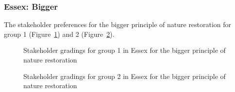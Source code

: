 \documentclass[
  12pt,
  letterpaper,
  DIV=11,
  numbers=noendperiod]{scrartcl}
\begin{document}
\newpage{}

\subsubsection{Essex: Bigger}\label{essex-bigger}

The stakeholder preferences for the bigger principle of nature
restoration for group 1 (Figure~\ref{fig-EsBigG1}) and 2
(Figure~\ref{fig-EsBigG2}).

\begin{figure}[H]


\caption{\label{fig-EsBigG1}Stakeholder gradings for group 1 in Essex
for the bigger principle of nature restoration}

\end{figure}%

\begin{figure}[H]


\caption{\label{fig-EsBigG2}Stakeholder gradings for group 2 in Essex
for the bigger principle of nature restoration}

\end{figure}%
\end{document}
